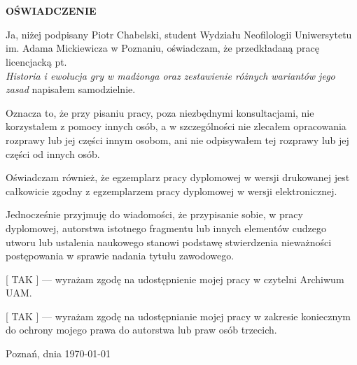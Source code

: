 \chapter*{}
\vspace*{7em}
\begin{center}
  \bfseries\large OŚWIADCZENIE
\end{center}

\vspace*{3em}
  Ja, niżej podpisany Piotr Chabelski, student Wydziału Neofilologii
  Uniwersytetu im. Adama Mickiewicza w Poznaniu, oświadczam, że przedkładaną
  pracę licencjacką pt.\\ {\itshape Historia i ewolucja gry w madżonga oraz
  zestawienie różnych wariantów jego zasad} napisałem samodzielnie.

Oznacza to, że przy pisaniu pracy, poza niezbędnymi konsultacjami, nie
korzystałem z pomocy innych osób, a w szczególności nie zlecałem opracowania
rozprawy lub jej części innym osobom, ani nie odpisywałem tej rozprawy lub jej
części od innych osób.

Oświadczam  również,  że  egzemplarz  pracy  dyplomowej  w  wersji  drukowanej 
jest całkowicie zgodny z egzemplarzem pracy dyplomowej w wersji elektronicznej.

Jednocześnie  przyjmuję  do  wiadomości,  że  przypisanie  sobie,  w pracy 
dyplomowej, autorstwa  istotnego  fragmentu  lub  innych  elementów  cudzego 
utworu  lub  ustalenia naukowego  stanowi  podstawę  stwierdzenia  nieważności 
postępowania  w  sprawie nadania tytułu zawodowego.

[ TAK ] --- wyrażam zgodę na udostępnienie mojej pracy w czytelni Archiwum UAM.

[ TAK ] --- wyrażam zgodę na udostępnianie mojej pracy w zakresie koniecznym do
ochrony mojego prawa do autorstwa lub praw osób trzecich.

\vspace{2cm}
\begin{flushleft}
  Poznań, dnia \today
\end{flushleft}

\vspace*{\fill}
